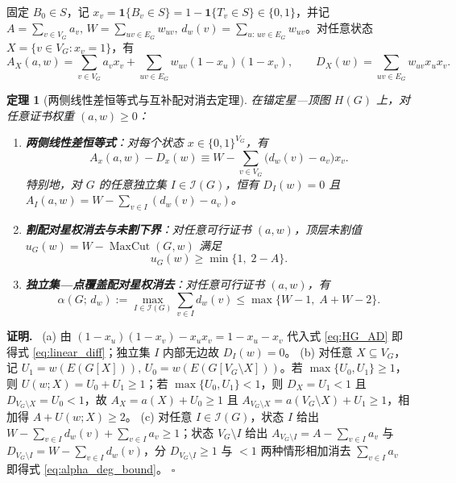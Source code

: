 \documentclass[11pt,a4paper]{ctexart}
\newtheorem{theorem}{定理}[section]
\theoremstyle{definition}
\newenvironment{proofcn}{\par\noindent\textbf{证明.}\ }{\hfill$\square$\par}
\newcommand{\Ind}{\mathcal I}
\newcommand{\1}{\boldsymbol 1}
\newcommand{\0}{\boldsymbol 0}
\begin{document}
固定 $B_0\in S$，记 $x_v=\1\{B_v\in S\}=1-\1\{T_v\in S\}\in\{0,1\}$，并记 $A=\sum_{v\in V_G}a_v,\, W=\sum_{uv\in E_G}w_{uv},\, d_w(v)=\sum_{u:\,uv\in E_G}w_{uv}$。对任意状态 $X=\{v\in V_G:x_v=1\}$，有
\begin{equation}\label{eq:HG_AD}
 A_X(a,w)=\sum_{v\in V_G}a_v x_v + \sum_{uv\in E_G}w_{uv}(1-x_u)(1-x_v),\qquad
 D_X(w)=\sum_{uv\in E_G}w_{uv}x_u x_v.
\end{equation}

\begin{theorem}[两侧线性差恒等式与互补配对消去定理]\label{thm:HG_identities}
在锚定星—顶图 $H(G)$ 上，对任意证书权重 $(a,w)\ge 0$：
\begin{enumerate}[label=(\alph*)]
\item \textbf{两侧线性差恒等式}：对每个状态 $x\in\{0,1\}^{V_G}$，有
\begin{equation}\label{eq:linear_diff}
 \boxed{A_x(a,w) - D_x(w) \equiv W - \sum_{v\in V_G}\bigl(d_w(v)-a_v\bigr)x_v.}
\end{equation}
特别地，对 $G$ 的任意独立集 $I\in\Ind(G)$，恒有 $D_I(w)=0$ 且 $A_I(a,w) = W - \sum_{v\in I}(d_w(v)-a_v)$。
\item \textbf{割配对星权消去与未割下界}：对任意可行证书 $(a,w)$，顶层未割值 $u_G(w)=W-\operatorname{MaxCut}(G,w)$ 满足
\begin{equation}\label{eq:uncut_duality}
 \boxed{u_G(w)\ge \min\{1,\; 2-A\}.}
\end{equation}
\item \textbf{独立集—点覆盖配对星权消去}：对任意可行证书 $(a,w)$，有
\begin{equation}\label{eq:alpha_deg_bound}
 \boxed{\alpha(G;\,d_w):=\max_{I\in\Ind(G)}\sum_{v\in I}d_w(v)\le \max\{W-1,\; A+W-2\}.}
\end{equation}
\end{enumerate}
\end{theorem}
\begin{proofcn}
(a) 由 $(1-x_u)(1-x_v)-x_u x_v = 1 - x_u - x_v$ 代入式 \eqref{eq:HG_AD} 即得式 \eqref{eq:linear_diff}；独立集 $I$ 内部无边故 $D_I(w)=0$。
(b) 对任意 $X\subseteq V_G$，记 $U_1=w(E(G[X])),\, U_0=w(E(G[V_G\setminus X]))$。若 $\max\{U_0,U_1\}\ge 1$，则 $U(w;X)=U_0+U_1\ge 1$；若 $\max\{U_0,U_1\}<1$，则 $D_X=U_1<1$ 且 $D_{V_G\setminus X}=U_0<1$，故 $A_X=a(X)+U_0\ge 1$ 且 $A_{V_G\setminus X}=a(V_G\setminus X)+U_1\ge 1$，相加得 $A+U(w;X)\ge 2$。
(c) 对任意 $I\in\Ind(G)$，状态 $I$ 给出 $W-\sum_{v\in I}d_w(v)+\sum_{v\in I}a_v\ge 1$；状态 $V_G\setminus I$ 给出 $A_{V_G\setminus I}=A-\sum_{v\in I}a_v$ 与 $D_{V_G\setminus I}=W-\sum_{v\in I}d_w(v)$，分 $D_{V_G\setminus I}\ge 1$ 与 $<1$ 两种情形相加消去 $\sum_{v\in I}a_v$ 即得式 \eqref{eq:alpha_deg_bound}。
\end{proofcn}
\end{document}
